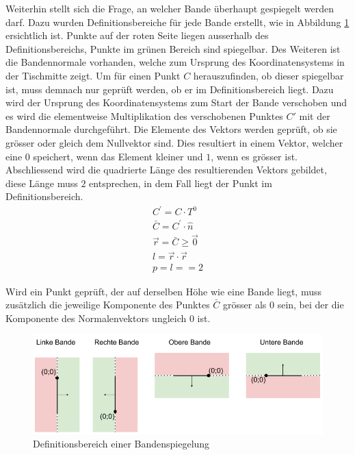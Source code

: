 \newpage
Weiterhin stellt sich die Frage, an welcher Bande überhaupt gespiegelt werden darf. Dazu wurden Definitionsbereiche
für jede Bande erstellt, wie in Abbildung \ref{fig:Definitionsbereich_Bandenspiegelung} ersichtlich ist. Punkte auf
der roten Seite liegen ausserhalb des Definitionsbereichs, Punkte im grünen Bereich sind spiegelbar. Des Weiteren
ist die Bandennormale vorhanden, welche zum Ursprung des Koordinatensystems in der Tischmitte zeigt. Um für einen Punkt
$C$ herauszufinden, ob dieser spiegelbar ist, muss demnach nur geprüft werden, ob er im Definitionsbereich liegt.
Dazu wird der Ursprung des Koordinatensystems zum Start der Bande verschoben und es wird die elementweise Multiplikation
des verschobenen Punktes $C'$ mit der Bandennormale durchgeführt.
Die Elemente des Vektors werden geprüft, ob sie grösser oder gleich dem Nullvektor sind.
Dies resultiert in einem Vektor, welcher eine $0$ speichert, wenn das Element kleiner und $1$, wenn es grösser ist.
Abschliessend wird die quadrierte Länge des resultierenden Vektors gebildet, diese Länge muss $2$ entsprechen, in dem
Fall liegt der Punkt im Definitionsbereich.
\begin{align}
    C^{'} = C \cdot T^0\\
    \bar{C} = C^{'} \cdot \hat{n}\\
    \vec{r} = \bar{C} \geq \vec{0}\\
    l = \vec{r} \cdot \vec{r}\\
    p = l == 2
\end{align}

Wird ein Punkt geprüft, der auf derselben Höhe wie eine Bande liegt, muss zusätzlich die jeweilige Komponente des Punktes
$\bar{C}$ grösser als $0$ sein, bei der die Komponente des Normalenvektors ungleich $0$ ist.

\begin{figure}[h!]
    \begin{center}
        \includegraphics[width=1\linewidth]{../common/03_billiard_ai/resources/49_definitionsbereich_spiegelung_bande.png}
    \end{center}
    \caption{Definitionsbereich einer Bandenspiegelung}
    \label{fig:Definitionsbereich_Bandenspiegelung}
\end{figure}


